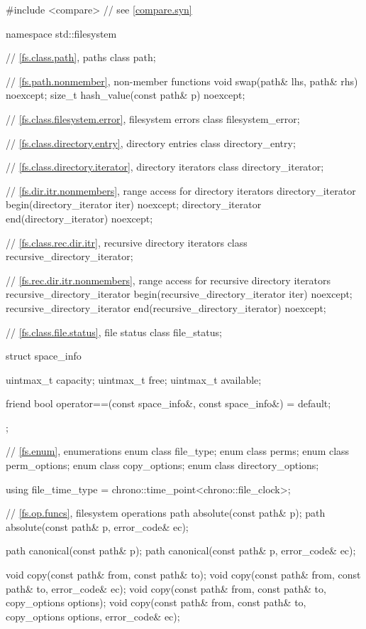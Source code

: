 %
\begin{codeblock}
#include <compare>              // see \ref{compare.syn}

namespace std::filesystem {
  // \ref{fs.class.path}, paths
  class path;

  // \ref{fs.path.nonmember},  non-member functions
  void swap(path& lhs, path& rhs) noexcept;
  size_t hash_value(const path& p) noexcept;

  // \ref{fs.class.filesystem.error}, filesystem errors
  class filesystem_error;

  // \ref{fs.class.directory.entry}, directory entries
  class directory_entry;

  // \ref{fs.class.directory.iterator}, directory iterators
  class directory_iterator;

  // \ref{fs.dir.itr.nonmembers}, range access for directory iterators
  directory_iterator begin(directory_iterator iter) noexcept;
  directory_iterator end(directory_iterator) noexcept;

  // \ref{fs.class.rec.dir.itr}, recursive directory iterators
  class recursive_directory_iterator;

  // \ref{fs.rec.dir.itr.nonmembers}, range access for recursive directory iterators
  recursive_directory_iterator begin(recursive_directory_iterator iter) noexcept;
  recursive_directory_iterator end(recursive_directory_iterator) noexcept;

  // \ref{fs.class.file.status}, file status
  class file_status;

  struct space_info {
    uintmax_t capacity;
    uintmax_t free;
    uintmax_t available;

    friend bool operator==(const space_info&, const space_info&) = default;
  };

  // \ref{fs.enum}, enumerations
  enum class file_type;
  enum class perms;
  enum class perm_options;
  enum class copy_options;
  enum class directory_options;

  using file_time_type = chrono::time_point<chrono::file_clock>;

  // \ref{fs.op.funcs}, filesystem operations
  path absolute(const path& p);
  path absolute(const path& p, error_code& ec);

  path canonical(const path& p);
  path canonical(const path& p, error_code& ec);

  void copy(const path& from, const path& to);
  void copy(const path& from, const path& to, error_code& ec);
  void copy(const path& from, const path& to, copy_options options);
  void copy(const path& from, const path& to, copy_options options,
            error_code& ec);

}
\end{codeblock}
